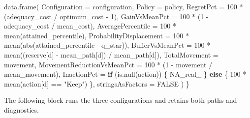 \documentclass[
  10pt,
]{article}
\newenvironment{Shaded}{\begin{snugshade}}{\end{snugshade}}
\newcommand{\AttributeTok}[1]{\textcolor[rgb]{0.77,0.63,0.00}{#1}}
\newcommand{\ConstantTok}[1]{\textcolor[rgb]{0.00,0.00,0.00}{#1}}
\newcommand{\ControlFlowTok}[1]{\textcolor[rgb]{0.13,0.29,0.53}{\textbf{#1}}}
\newcommand{\DecValTok}[1]{\textcolor[rgb]{0.00,0.00,0.81}{#1}}
\newcommand{\FunctionTok}[1]{\textcolor[rgb]{0.00,0.00,0.00}{#1}}
\newcommand{\NormalTok}[1]{#1}
\newcommand{\SpecialCharTok}[1]{\textcolor[rgb]{0.00,0.00,0.00}{#1}}
\newcommand{\StringTok}[1]{\textcolor[rgb]{0.31,0.60,0.02}{#1}}
\begin{document}
\begin{Shaded}
\begin{Highlighting}[]
  \FunctionTok{data.frame}\NormalTok{(}
    \AttributeTok{Configuration =}\NormalTok{ configuration,}
    \AttributeTok{Policy =}\NormalTok{ policy,}
    \AttributeTok{RegretPct =} \DecValTok{100} \SpecialCharTok{*}\NormalTok{ (adequacy\_cost }\SpecialCharTok{/}\NormalTok{ optimum\_cost }\SpecialCharTok{{-}} \DecValTok{1}\NormalTok{),}
    \AttributeTok{GainVsMeanPct =} \DecValTok{100} \SpecialCharTok{*}\NormalTok{ (}\DecValTok{1} \SpecialCharTok{{-}}\NormalTok{ adequacy\_cost }\SpecialCharTok{/}\NormalTok{ mean\_cost),}
    \AttributeTok{AveragePercentile =} \DecValTok{100} \SpecialCharTok{*} \FunctionTok{mean}\NormalTok{(attained\_percentile),}
    \AttributeTok{ProbabilityDisplacement =}
      \DecValTok{100} \SpecialCharTok{*} \FunctionTok{mean}\NormalTok{(}\FunctionTok{abs}\NormalTok{(attained\_percentile }\SpecialCharTok{{-}}\NormalTok{ q\_star)),}
    \AttributeTok{BufferVsMeanPct =}
      \DecValTok{100} \SpecialCharTok{*} \FunctionTok{mean}\NormalTok{((reserve[d] }\SpecialCharTok{{-}}\NormalTok{ mean\_path[d]) }\SpecialCharTok{/}\NormalTok{ mean\_path[d]),}
    \AttributeTok{TotalMovement =}\NormalTok{ movement,}
    \AttributeTok{MovementReductionVsMeanPct =}
      \DecValTok{100} \SpecialCharTok{*}\NormalTok{ (}\DecValTok{1} \SpecialCharTok{{-}}\NormalTok{ movement }\SpecialCharTok{/}\NormalTok{ mean\_movement),}
    \AttributeTok{InactionPct =} \ControlFlowTok{if}\NormalTok{ (}\FunctionTok{is.null}\NormalTok{(action)) \{}
      \ConstantTok{NA\_real\_}
\NormalTok{    \} }\ControlFlowTok{else}\NormalTok{ \{}
      \DecValTok{100} \SpecialCharTok{*} \FunctionTok{mean}\NormalTok{(action[d] }\SpecialCharTok{==} \StringTok{"Keep"}\NormalTok{)}
\NormalTok{    \},}
    \AttributeTok{stringsAsFactors =} \ConstantTok{FALSE}
\NormalTok{  )}
\NormalTok{\}}
\end{Highlighting}
\end{Shaded}

The following block runs the three configurations and retains both paths
and diagnostics.
\end{document}
